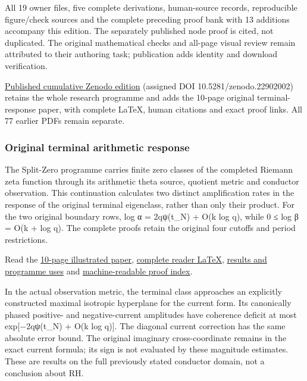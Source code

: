 \documentclass[
]{article}
\begin{document}
All 19 owner files, five complete derivations, human-source records,
reproducible figure/check sources and the complete preceding proof bank
with 13 additions accompany this edition. The separately published node
proof is cited, not duplicated. The original mathematical checks and
all-page visual review remain attributed to their authoring task;
publication adds identity and download verification.

\href{https://zenodo.org/records/22902002}{Published cumulative Zenodo
edition} (assigned DOI 10.5281/zenodo.22902002) retains the whole
research programme and adds the 10-page original terminal-response
paper, with complete LaTeX, human citations and exact proof links. All
77 earlier PDFs remain separate.

\subsubsection{Original terminal arithmetic
response}\label{original-terminal-arithmetic-response}

The Split-Zero programme carries finite zero classes of the completed
Riemann zeta function through its arithmetic theta source, quotient
metric and conductor observation. This continuation calculates two
distinct amplification rates in the response of the original terminal
eigenclass, rather than only their product. For the two original
boundary rows, log α = 2qψ(t\_N) + O(k log q), while 0 ≤ log β = O(k +
log q). The complete proofs retain the original four cutoffs and period
restrictions.

Read the
\href{https://github.com/KokunoYumeto/zeta-function-research-reader/blob/main/workbenches/splitzero-tandem/continuations/20260922-terminal-response/TERMINAL_RESPONSE_READER.pdf}{10-page
illustrated paper},
\href{https://github.com/KokunoYumeto/zeta-function-research-reader/blob/main/workbenches/splitzero-tandem/continuations/20260922-terminal-response/TERMINAL_RESPONSE_READER.tex}{complete
reader LaTeX},
\href{https://github.com/KokunoYumeto/zeta-function-research-reader/blob/main/workbenches/splitzero-tandem/continuations/20260922-terminal-response/RESULTS_20260922_027.md}{results
and programme uses} and
\href{https://github.com/KokunoYumeto/zeta-function-research-reader/blob/main/workbenches/splitzero-tandem/continuations/20260922-terminal-response/RESULT_INDEX.json}{machine-readable
proof index}.

In the actual observation metric, the terminal class approaches an
explicitly constructed maximal isotropic hyperplane for the current
form. Its canonically phased positive- and negative-current amplitudes
have coherence deficit at most exp{[}−2qψ(t\_N) + O(k log q){]}. The
diagonal current correction has the same absolute error bound. The
original imaginary cross-coordinate remains in the exact current
formula; its sign is not evaluated by these magnitude estimates. These
are results on the full previously stated conductor domain, not a
conclusion about RH.
\end{document}
